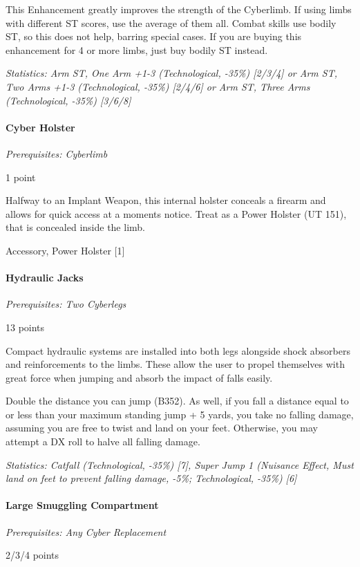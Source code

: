 \begin{multicols*}{3}
	This Enhancement greatly improves the strength of the Cyberlimb. If using limbs with different ST scores, use the average of them all. Combat skills use bodily ST, so this does not help, barring special cases. If you are buying this enhancement for 4 or more limbs, just buy bodily ST instead. 
	
	\textit{\textcolor{OliveGreen}{Statistics: Arm ST, One Arm +1-3 (Technological, -35\%) [2/3/4] or Arm ST, Two Arms +1-3 (Technological, -35\%) [2/4/6] or Arm ST, Three Arms (Technological, -35\%) [3/6/8]}}
	
	
	\paragraph{Cyber Holster}
	\textit{Prerequisites: Cyberlimb}
	\begin{flushright}
		1 point
	\end{flushright}

	Halfway to an Implant Weapon, this internal holster conceals a firearm and allows for quick access at a moments notice. Treat as a Power Holster (UT 151), that is concealed inside the limb.
	
	Accessory, Power Holster [1]
	
	\paragraph{Hydraulic Jacks}
	\textit{Prerequisites: Two Cyberlegs}
	\begin{flushright}
		13 points
	\end{flushright}
	
	Compact hydraulic systems are installed into both legs alongside shock absorbers and reinforcements to the limbs. These  allow the user to propel themselves with great force when jumping and absorb the impact of falls easily.
	
	Double the distance you can jump (B352). As well, if you fall a distance equal to or less than your maximum standing jump + 5 yards, you take no falling damage, assuming you are free to twist and land on your feet. Otherwise, you may attempt a DX roll to halve all falling damage.
	
	\textit{\textcolor{OliveGreen}{Statistics: Catfall (Technological, -35\%) [7], Super Jump 1 (Nuisance Effect, Must land on feet to prevent falling damage, -5\%; Technological, -35\%) [6]}}
	
	\paragraph{Large Smuggling Compartment}
	\textit{Prerequisites: Any Cyber Replacement}
	\begin{flushright}
		2/3/4 points
	\end{flushright}
	

\end{multicols*}
